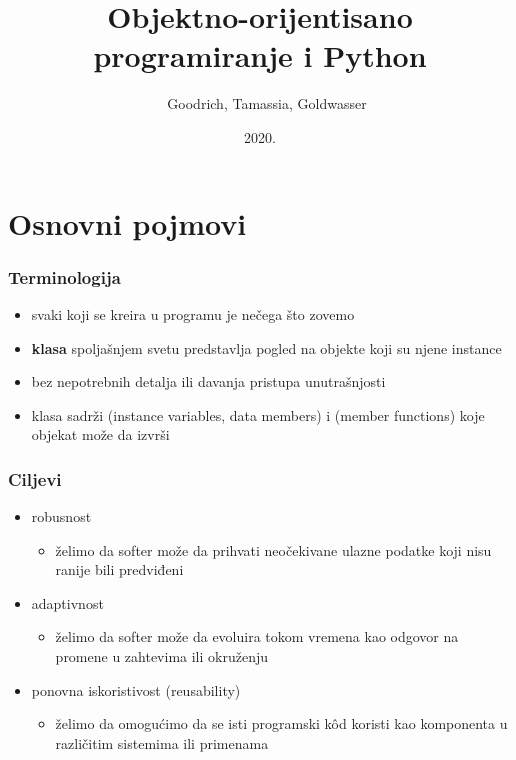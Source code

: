 \documentclass[compress,aspectratio=169]{beamer}
\title{Objektno-orijentisano programiranje i Python}
\author{\textcopyright \ \ Goodrich, Tamassia, Goldwasser}
\institute{Katedra za informatiku, Fakultet tehničkih nauka, Univerzitet u
Novom Sadu}
\date{2020.}
\begin{document}
\frame{\titlepage}

\section[Osnovni pojmovi]{Osnovni pojmovi}
\begin{frame}[fragile]
  \frametitle{Terminologija}
  \begin{itemize}
    \item svaki  koji se kreira u programu je  nečega što zovemo 
    \item \textbf{klasa} spoljašnjem svetu predstavlja pogled na objekte koji su njene instance
    \item bez nepotrebnih detalja ili davanja pristupa unutrašnjosti
    \item klasa sadrži  (instance variables, data members) i  (member functions) koje objekat može da izvrši 
  \end{itemize}
\end{frame}

\begin{frame}[fragile]
  \frametitle{Ciljevi}
  \begin{itemize}
    \item robusnost
    \begin{itemize}
      \item želimo da softer može da prihvati neočekivane ulazne podatke koji nisu ranije bili predviđeni
    \end{itemize}
    \item adaptivnost
    \begin{itemize}
      \item želimo da softer može da evoluira tokom vremena kao odgovor na promene u zahtevima ili okruženju
    \end{itemize}
    \item ponovna iskoristivost (reusability)
    \begin{itemize}
      \item želimo da omogućimo da se isti programski kôd koristi kao komponenta u različitim sistemima ili primenama
    \end{itemize}
  \end{itemize}
\end{frame}
\end{document}
